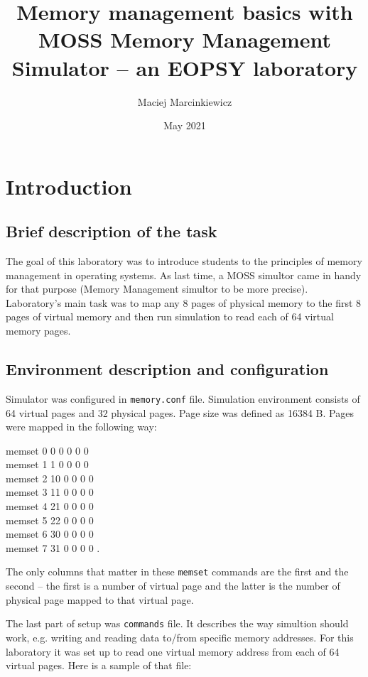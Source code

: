\documentclass{article}
\title{Memory management basics with MOSS Memory Management Simulator -- an EOPSY laboratory}
\author{Maciej Marcinkiewicz}
\date{\nth{18} May 2021}
\begin{document}
\maketitle

\section{Introduction}
\subsection{Brief description of the task}
The goal of this laboratory was to introduce students to the principles of memory management
in operating systems. As last time, a MOSS simultor came in handy for that purpose (Memory Management simultor to be more precise).
Laboratory's main task was to map any 8 pages of physical memory to the first 8 pages of virtual memory and then run simulation
to read each of 64 virtual memory pages.

\subsection{Environment description and configuration}
Simulator was configured in \texttt{memory.conf} file. Simulation environment consists of 64 virtual pages and 32 physical pages. Page size was defined as 16384 B.
Pages were mapped in the following way:

\noindent
\ttfamily
memset 0 0 0 0 0 0\\
memset 1 1 0 0 0 0      \\
memset 2 10 0 0 0 0      \\
memset 3 11 0 0 0 0      \\
memset 4 21 0 0 0 0      \\
memset 5 22 0 0 0 0      \\
memset 6 30 0 0 0 0      \\
memset 7 31 0 0 0 0
\rmfamily
.

The only columns that matter in these \texttt{memset} commands are the first and the second --
the first is a number of virtual page and the latter is the number of physical page mapped to
that virtual page.

The last part of setup was \texttt{commands} file. It describes the way simultion should work,
e.g. writing and reading data to/from specific memory addresses. For this laboratory it was set up
to read one virtual memory address from each of 64 virtual pages. Here is a sample of that file:
\end{document}
